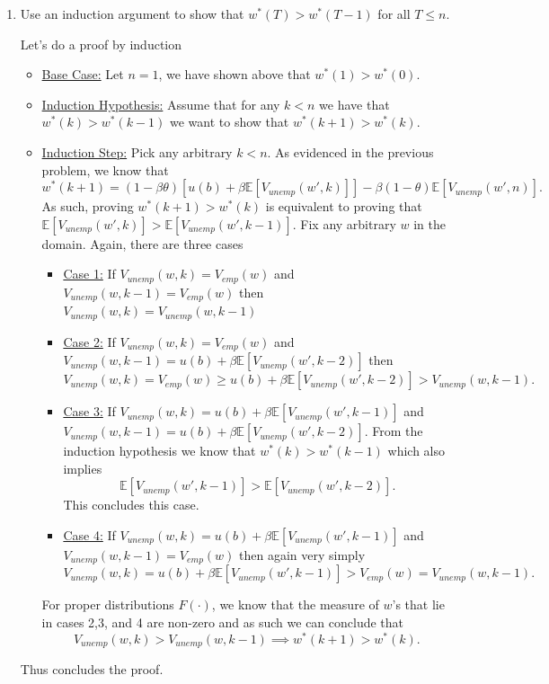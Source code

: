 \documentclass[11pt,english]{article}
\begin{document}
\begin{enumerate}
 \item Use an induction argument to show that $w^*(T) > w^*(T-1)$ for all
 $T \leq n$.
 \begin{solution}
 Let's do a proof by induction
\begin{itemize}
\item \underline{Base Case:} Let $n = 1$, we have shown above that $w^*(1) > w^*(0)$.
\item  \underline{Induction Hypothesis:} Assume that for any $k < n$ we have that $w^*(k) > w^*(k-1)$ we want to show that $w^*(k+1) > w^*(k)$.
\item \underline{Induction Step:} Pick any arbitrary $k < n$. As evidenced in the previous problem, we know that $$w^*(k+1) = (1 - \beta \theta) \left[u(b) + \beta \mathbb{E}\left[V_{unemp}(w',k)\right]\right] - \beta (1 -\theta)\mathbb{E}[V_{unemp}(w',n)].$$As such, proving $w^*(k+1) > w^*(k)$ is equivalent to proving that $\mathbb{E}\left[V_{unemp}(w',k)\right] > \mathbb{E}\left[V_{unemp}(w',k-1)\right]$. Fix any arbitrary $w$ in the domain. Again, there are three cases
\begin{itemize}
\item \underline{Case 1:} If $V_{unemp}(w, k) = V_{emp}(w)$ and $V_{unemp}(w, k-1) = V_{emp}(w)$ then $V_{unemp}(w, k) = V_{unemp}(w, k-1)$
\item \underline{Case 2:} If $V_{unemp}(w, k) = V_{emp}(w)$ and $V_{unemp}(w, k-1) =u(b) +  \beta \mathbb{E}[V_{unemp}(w', k-2)]$ then $$V_{unemp}(w,k) = V_{emp}(w) \geq u(b) +  \beta \mathbb{E}[V_{unemp}(w', k-2)] > V_{unemp}(w, k-1).$$
\item \underline{Case 3:} If $V_{unemp}(w,k) =  u(b) +  \beta \mathbb{E}[V_{unemp}(w', k-1)]$ and $V_{unemp}(w, k-1) =u(b) + \beta \mathbb{E}[V_{unemp}(w', k-2)]$. From the induction hypothesis we know that $w^*(k) > w^*(k-1)$ which also implies $$\mathbb{E}[V_{unemp}(w', k-1)] > \mathbb{E}[V_{unemp}(w', k-2)].$$ This concludes this case.
\item \underline{Case 4:} If $V_{unemp}(w,k) =  u(b) +  \beta \mathbb{E}[V_{unemp}(w', k-1)]$ and $V_{unemp}(w, k-1) = V_{emp}(w)$ then again very simply  $$V_{unemp}(w,k) = u(b) +  \beta \mathbb{E}[V_{unemp}(w', k-1)] >  V_{emp}(w) = V_{unemp}(w, k-1).$$
\end{itemize}
For proper distributions $F(\cdot)$, we know that the measure of $w$'s that lie in cases 2,3, and 4 are non-zero and as such we can conclude that $$V_{unemp}(w,k) > V_{unemp}(w,k-1) \implies w^*(k+1) > w^*(k).$$
\end{itemize}Thus concludes the proof.
 \end{solution}
 

\end{enumerate}
\end{document}
